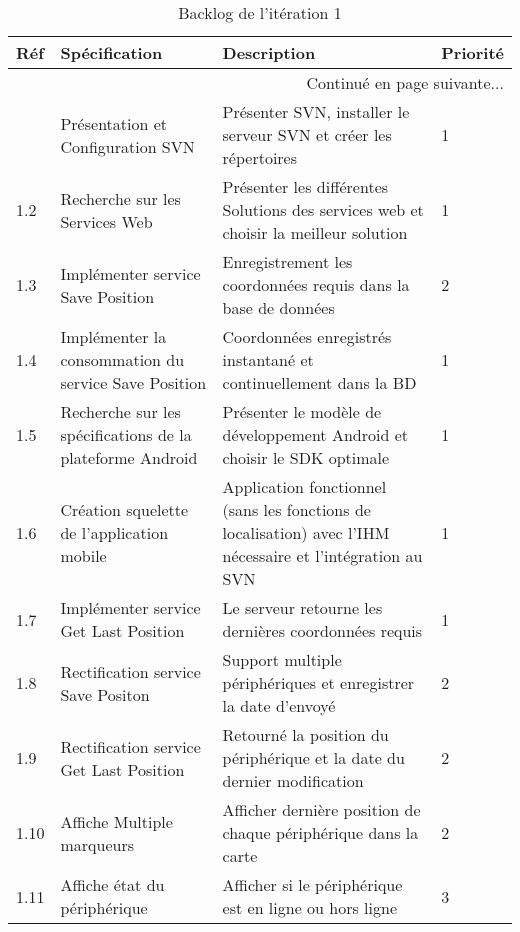 \begin{center}
    \footnotesize
    \begin{longtable}{| p{1cm} | p{5cm} | p{7cm} | p{1cm} |}
        \caption{Backlog de l'itération 1}
        \label{tab:sprint1-backlog} \\

        \hline
        \textbf{Réf} & \textbf{Spécification} & \textbf{Description} & \textbf{Priorité} \\ \hline
        \endhead

        \hline \multicolumn{4}{|r|}{{Continué en page suivante$\dotsc$}} \\ \hline
        \endfoot

        \hline \hline
        \endlastfoot

        \hline
1.1 & Présentation et Configuration SVN & Présenter SVN, installer le serveur SVN et créer les répertoires & 1 \\ \hline
1.2 & Recherche sur les Services Web & Présenter les différentes Solutions des services web et choisir la meilleur solution & 1 \\ \hline
1.3 & Implémenter service Save Position & Enregistrement les coordonnées requis dans la base de données & 2 \\ \hline
1.4 & Implémenter la consommation du service Save Position & Coordonnées enregistrés instantané et continuellement dans la BD & 1 \\ \hline
1.5 & Recherche sur les spécifications de la plateforme Android & Présenter le modèle de développement Android et choisir le SDK optimale & 1 \\ \hline
1.6 & Création squelette de l'application mobile & Application fonctionnel (sans les fonctions de localisation) avec l'IHM nécessaire et l'intégration au SVN & 1 \\ \hline
1.7 & Implémenter service Get Last Position & Le serveur retourne les dernières coordonnées requis & 1 \\ \hline
1.8 & Rectification service Save Positon & Support multiple périphériques et enregistrer la date d'envoyé & 2 \\ \hline
1.9 & Rectification service Get Last Position & Retourné la position du périphérique et la date du dernier modification & 2 \\ \hline
1.10 & Affiche Multiple marqueurs & Afficher dernière position de chaque périphérique dans la carte & 2 \\ \hline
1.11 & Affiche état du périphérique & Afficher si le périphérique est en ligne ou hors ligne & 3 \\ \hline
    \end{longtable}
\end{center}

